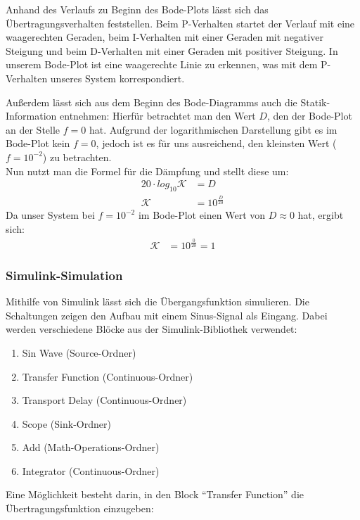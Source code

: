  Anhand des Verlaufs zu Beginn des Bode-Plots lässt sich das Übertragungsverhalten feststellen. Beim P-Verhalten startet der Verlauf mit eine waagerechten Geraden, beim I-Verhalten mit einer Geraden mit negativer Steigung und beim D-Verhalten mit einer Geraden mit positiver Steigung. 
 In unserem Bode-Plot ist eine waagerechte Linie zu erkennen, was mit dem P-Verhalten unseres System korrespondiert.

 Außerdem lässt sich aus dem Beginn des Bode-Diagramms auch die Statik-Information entnehmen: Hierfür betrachtet man den Wert $D$, den der Bode-Plot an der Stelle $f = 0$ hat. Aufgrund der logarithmischen Darstellung gibt es im Bode-Plot kein $f = 0$, jedoch ist es für uns ausreichend, den kleinsten Wert ($f = 10^{-2}$) zu betrachten. \\
 Nun nutzt man die Formel für die Dämpfung und stellt diese um:
 \begin{align*}
    20 \cdot log_{10} \mathcal{K} &= D \\
    \mathcal{K} &= 10^{\frac{D}{20}}
 \end{align*}
 Da unser System bei $f = 10^{-2}$ im Bode-Plot einen Wert von $D \approx 0$ hat, ergibt sich:
 \begin{align*}
    \mathcal{K} &= 10^{\frac{0}{20}} = 1
\end{align*}

\subsubsection{Simulink-Simulation}
Mithilfe von Simulink lässt sich die Übergangsfunktion simulieren. Die Schaltungen zeigen den Aufbau mit einem Sinus-Signal als Eingang.
Dabei werden verschiedene Blöcke aus der Simulink-Bibliothek verwendet:
\begin{enumerate}
    \item Sin Wave (Source-Ordner)
    \item Transfer Function (Continuous-Ordner)
    \item Transport Delay (Continuous-Ordner)
    \item Scope (Sink-Ordner)
    \item Add (Math-Operations-Ordner)
    \item Integrator (Continuous-Ordner)
\end{enumerate}

Eine Möglichkeit besteht darin, in den Block \enquote{Transfer Function} die Übertragungsfunktion einzugeben:

